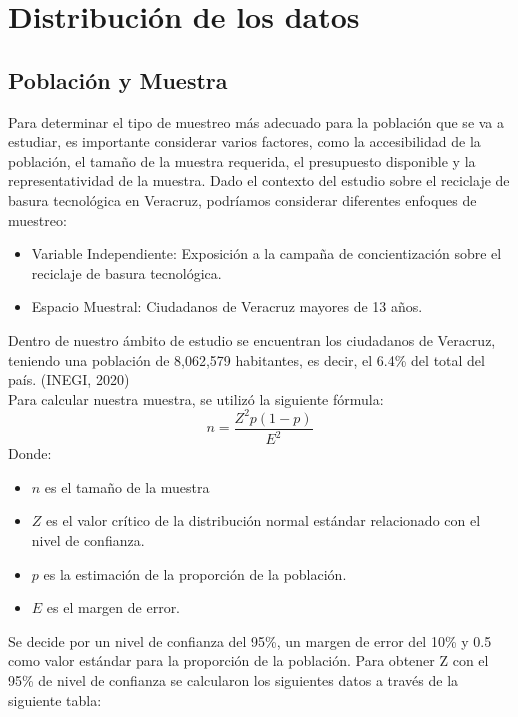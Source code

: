 \documentclass[letterpaper,12pt]{article}
\begin{document}
\begin{sloppypar}
\section{Distribución de los datos}
\subsection{Población y Muestra}
Para determinar el tipo de muestreo más adecuado para la población que se va a estudiar, es importante considerar varios factores, como la accesibilidad de la población, el tamaño de la muestra requerida, el presupuesto disponible y la representatividad de la muestra. Dado el contexto del estudio sobre el reciclaje de basura tecnológica en Veracruz, podríamos considerar diferentes enfoques de muestreo: 
\begin{itemize}
    \item Variable Independiente: Exposición a la campaña de concientización sobre el reciclaje de basura tecnológica.
    \item Espacio Muestral: Ciudadanos de Veracruz mayores de 13 años.
\end{itemize}
Dentro de nuestro ámbito de estudio se encuentran los ciudadanos de Veracruz, teniendo
una población de 8,062,579 habitantes, es decir, el 6.4\% del total del país. (INEGI, 2020)
\vspace{0.3cm}\\
Para calcular nuestra muestra, se utilizó la siguiente fórmula:
$$ n = \frac{Z^{2}p(1-p)}{E^{2}}$$
Donde:
\begin{itemize}
    \item $n$ es el tamaño de la muestra
    \item $Z$ es el valor crítico de la distribución normal estándar relacionado con el nivel de confianza.
    \item $p$ es la estimación de la proporción de la población.
    \item $E$ es el margen de error.
\end{itemize}
Se decide por un nivel de confianza del 95\%, un margen de error del 10\% y 0.5 como valor estándar para la proporción de la población. Para obtener Z con el 95\% de nivel de confianza se calcularon los siguientes datos a través de la siguiente tabla:


\end{sloppypar}
\end{document}
